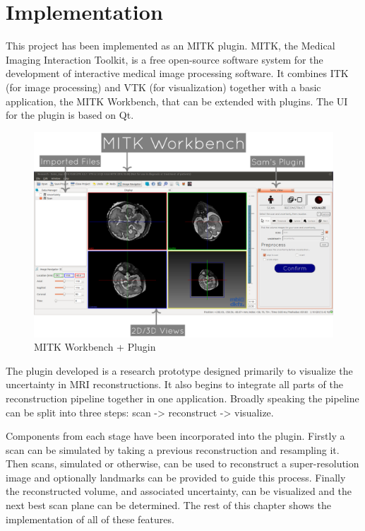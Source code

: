 \chapter{Implementation}\label{chapter:implementation}

This project has been implemented as an MITK plugin. MITK, the Medical Imaging Interaction Toolkit, is a free open-source software system for the development of interactive medical image processing software. It combines ITK (for image processing) and VTK (for visualization) together with a basic application, the MITK Workbench, that can be extended with plugins. The UI for the plugin is based on Qt.

\begin{figure}[H]
  \includegraphics[width=\textwidth]{images/tool/mitk.png}
  \caption{MITK Workbench + Plugin}\label{fig:mitkoverview}
\end{figure}

The plugin developed is a research prototype designed primarily to visualize the uncertainty in MRI reconstructions. It also begins to integrate all parts of the reconstruction pipeline together in one application. Broadly speaking the pipeline can be split into three steps: scan -> reconstruct -> visualize. 

Components from each stage have been incorporated into the plugin. Firstly a scan can be simulated by taking a previous reconstruction and resampling it. Then scans, simulated or otherwise, can be used to reconstruct a super-resolution image and optionally landmarks can be provided to guide this process. Finally the reconstructed volume, and associated uncertainty, can be visualized and the next best scan plane can be determined. The rest of this chapter shows the implementation of all of these features.

